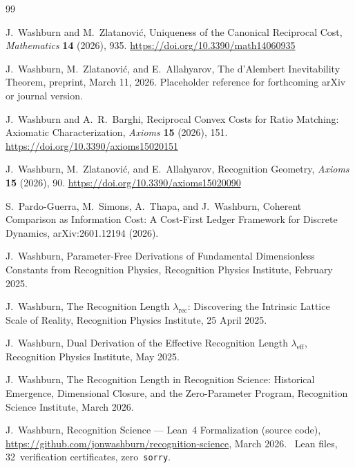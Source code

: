 \documentclass[12pt]{article}
\theoremstyle{definition}
\theoremstyle{remark}
\begin{document}
\begin{thebibliography}{99}

J.~Washburn and M.~Zlatanovi\'c,
\newblock Uniqueness of the Canonical Reciprocal Cost,
\newblock \emph{Mathematics} \textbf{14} (2026), 935.
\newblock \url{https://doi.org/10.3390/math14060935}

J.~Washburn, M.~Zlatanovi\'c, and E.~Allahyarov,
\newblock The d'Alembert Inevitability Theorem,
\newblock preprint, March 11, 2026.
\newblock Placeholder reference for forthcoming arXiv or journal version.

J.~Washburn and A.~R.~Barghi,
\newblock Reciprocal Convex Costs for Ratio Matching: Axiomatic
Characterization,
\newblock \emph{Axioms} \textbf{15} (2026), 151.
\newblock \url{https://doi.org/10.3390/axioms15020151}

J.~Washburn, M.~Zlatanovi\'c, and E.~Allahyarov,
\newblock Recognition Geometry,
\newblock \emph{Axioms} \textbf{15} (2026), 90.
\newblock \url{https://doi.org/10.3390/axioms15020090}

S.~Pardo-Guerra, M.~Simons, A.~Thapa, and J.~Washburn,
\newblock Coherent Comparison as Information Cost: A Cost-First Ledger
Framework for Discrete Dynamics,
\newblock arXiv:2601.12194 (2026).

J.~Washburn,
\newblock Parameter-Free Derivations of Fundamental Dimensionless
Constants from Recognition Physics,
\newblock Recognition Physics Institute, February 2025.

J.~Washburn,
\newblock The Recognition Length $\lambda_{\mathrm{rec}}$: Discovering
the Intrinsic Lattice Scale of Reality,
\newblock Recognition Physics Institute, 25 April 2025.

J.~Washburn,
\newblock Dual Derivation of the Effective Recognition Length
$\lambda_{\mathrm{eff}}$,
\newblock Recognition Physics Institute, May 2025.

J.~Washburn,
\newblock The Recognition Length in Recognition Science: Historical
Emergence, Dimensional Closure, and the Zero-Parameter Program,
\newblock Recognition Science Institute, March 2026.

J.~Washburn,
\newblock Recognition Science --- Lean~4 Formalization (source code),
\newblock \url{https://github.com/jonwashburn/recognition-science},
March 2026.
~Lean files, 32~verification certificates,
zero~\texttt{sorry}.

\end{thebibliography}
\end{document}
